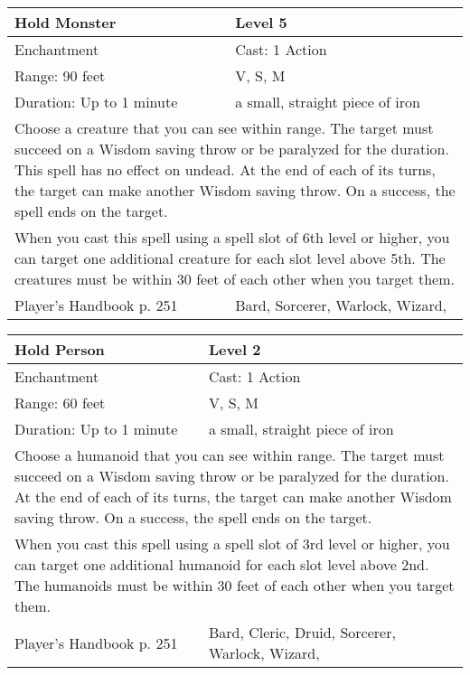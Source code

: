 \documentclass[11pt]{report}
\begin{document}
\begin{table}[H]
	\begin{tabular}{||p{6cm}|p{6cm}||}
		\hline\hline
		\bf{Hold Monster} & Level 5\\ \hline
		Enchantment & Cast: 1 Action\\ \hline
		Range: 90 feet & V, S, M\\ \hline
		Duration: Up to 1 minute & a small, straight piece of iron\\ \hline
		\multicolumn{2}{||p{12cm}||}{Choose a creature that you can see within range. The target must succeed on a Wisdom saving throw or be paralyzed for the duration. This spell has no effect on undead. At the end of each of its turns, the target can make another Wisdom saving throw. On a success, the spell ends on the target.}\\ \hline
		\multicolumn{2}{||p{12cm}||}{When you cast this spell using a spell slot of 6th level or higher, you can target one additional creature for each slot level above 5th. The creatures must be within 30 feet of each other when you target them.}\\ \hline
Player's Handbook p. 251 & Bard, Sorcerer, Warlock, Wizard, \\ \hline\hline
	\end{tabular}
\end{table}

\begin{table}[H]
	\begin{tabular}{||p{6cm}|p{6cm}||}
		\hline\hline
		\bf{Hold Person} & Level 2\\ \hline
		Enchantment & Cast: 1 Action\\ \hline
		Range: 60 feet & V, S, M\\ \hline
		Duration: Up to 1 minute & a small, straight piece of iron\\ \hline
		\multicolumn{2}{||p{12cm}||}{Choose a humanoid that you can see within range. The target must succeed on a Wisdom saving throw or be paralyzed for the duration. At the end of each of its turns, the target can make another Wisdom saving throw. On a success, the spell ends on the target.}\\ \hline
		\multicolumn{2}{||p{12cm}||}{When you cast this spell using a spell slot of 3rd level or higher, you can target one additional humanoid for each slot level above 2nd. The humanoids must be within 30 feet of each other when you target them.}\\ \hline
Player's Handbook p. 251 & Bard, Cleric, Druid, Sorcerer, Warlock, Wizard, \\ \hline\hline
	\end{tabular}
\end{table}
\end{document}
